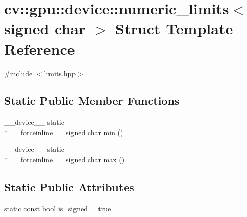 \hypertarget{structcv_1_1gpu_1_1device_1_1numeric__limits_3_01signed_01char_01_4}{\section{cv\-:\-:gpu\-:\-:device\-:\-:numeric\-\_\-limits$<$ signed char $>$ Struct Template Reference}
\label{structcv_1_1gpu_1_1device_1_1numeric__limits_3_01signed_01char_01_4}
}


{\ttfamily \#include $<$limits.\-hpp$>$}

\subsection*{Static Public Member Functions}
\begin{DoxyCompactItemize}
\item 
\-\_\-\-\_\-device\-\_\-\-\_\- static \\*
\-\_\-\-\_\-forceinline\-\_\-\-\_\- signed char \hyperlink{structcv_1_1gpu_1_1device_1_1numeric__limits_3_01signed_01char_01_4_a0fb3239685241fedfa64cb09ec347801}{min} ()
\item 
\-\_\-\-\_\-device\-\_\-\-\_\- static \\*
\-\_\-\-\_\-forceinline\-\_\-\-\_\- signed char \hyperlink{structcv_1_1gpu_1_1device_1_1numeric__limits_3_01signed_01char_01_4_a16d9557f892580c2bdd9d26220d7e28c}{max} ()
\end{DoxyCompactItemize}
\subsection*{Static Public Attributes}
\begin{DoxyCompactItemize}
\item 
static const bool \hyperlink{structcv_1_1gpu_1_1device_1_1numeric__limits_3_01signed_01char_01_4_abcc8bcba4d2b4fc2c42794aeb78319b8}{is\-\_\-signed} = \hyperlink{namespacecv_1_1gpu_1_1device_ac34c172a7a1904fb0fd477321a31f926}{true}
\end{DoxyCompactItemize}


